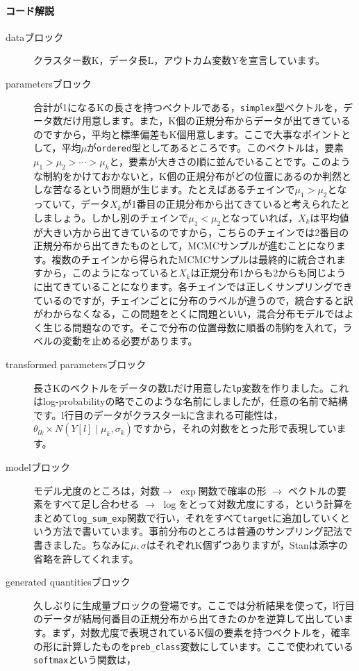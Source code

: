 \documentclass{ltjsbook}
\begin{document}
	\paragraph{コード解説}
	\begin{description}
		\item[dataブロック] クラスター数K，データ長L，アウトカム変数Yを宣言しています。
		\item[parametersブロック] 合計が1になるKの長さを持つベクトルである，\verb|simplex|型ベクトルを，データ数だけ用意します。また，K個の正規分布からデータが出てきているのですから，平均と標準偏差もK個用意します。ここで大事なポイントとして，平均$\mu$が\verb|ordered|型としてあるところです。このベクトルは，要素$\mu_1>\mu_2>\cdots>\mu_k$と，要素が大きさの順に並んでいることです。このような制約をかけておかないと，K個の正規分布がどの位置にあるのか判然としな苦なるという問題が生じます。たとえばあるチェインで$\mu_1>\mu_2$となっていて，データ$X_k$が1番目の正規分布から出てきていると考えられたとしましょう。しかし別のチェインで$\mu_1<\mu_2$となっていれば，$X_k$は平均値が大きい方から出てきているのですから，こちらのチェインでは2番目の正規分布から出てきたものとして，MCMCサンプルが進むことになります。複数のチェインから得られたMCMCサンプルは最終的に統合されますから，このようになっていると$X_k$は正規分布1からも2からも同じように出てきていることになります。各チェインでは正しくサンプリングできているのですが，チェインごとに分布のラベルが違うので，統合すると訳がわからなくなる，この問題をとくに問題といい，混合分布モデルではよく生じる問題なのです。そこで分布の位置母数に順番の制約を入れて，ラベルの変動を止める必要があります。
		\item[transformed parametersブロック] 長さKのベクトルをデータの数Lだけ用意した\verb|lp|変数を作りました。これはlog-probabilityの略でこのような名前にしましたが，任意の名前で結構です。l行目のデータがクラスターkに含まれる可能性は，$\theta_{lk} \times N(Y[l]\mid\mu_k,\sigma_k)$ですから，それの対数をとった形で表現しています。
		\item[modelブロック] モデル尤度のところは，対数$\to$ $\exp$関数で確率の形 $\to$ ベクトルの要素をすべて足し合わせる $\to$ $\log$をとって対数尤度にする，という計算をまとめて\verb|log_sum_exp|関数で行い，それをすべて\verb|target|に追加していくという方法で書いています。事前分布のところは普通のサンプリング記法で書きました。ちなみに$\mu,\sigma$はそれぞれK個ずつありますが，Stanは添字の省略を許してくれます。
		\item[generated quantitiesブロック] 久しぶりに生成量ブロックの登場です。ここでは分析結果を使って，l行目のデータが結局何番目の正規分布から出てきたのかを逆算して出しています。まず，対数尤度で表現されているK個の要素を持つベクトルを，確率の形に計算したものを\verb|preb_class|変数にしています。ここで使われている\verb|softmax|という関数は，

\end{description}
\end{document}
